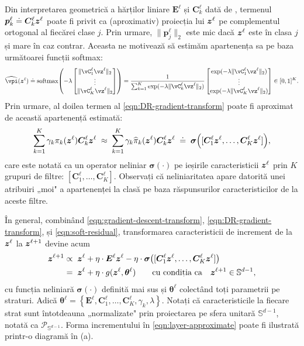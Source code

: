 \documentclass[../../book-main_ro.tex]{subfiles}
\begin{document}
Din interpretarea geometrică a hărților liniare $\bm E^\ell$ și $\bm C_k^\ell$ dată de , termenul $\bm p_{k}^{\ell} \doteq \bm C^{\ell}_k \bm{z}^{\ell}$ poate fi privit ca (aproximativ) proiecția lui $\bm{z}^{\ell}$ pe complementul ortogonal al fiecărei clase $j$. Prin urmare, $\|\bm p_{j}^{\ell}\|_2$ este mic dacă $\bm{z}^\ell$ este în clasa $j$ și mare în caz contrar. Aceasta ne motivează să estimăm apartenența sa pe baza următoarei funcții softmax:
\begin{equation}
    \widehat{\vpi}(\z^\ell) \doteq \softmax\rp{-\lambda\mat{\norm{\vC^{\ell}_{1}\vz^{\ell}}_{2} \\ \vdots \\ \norm{\vC^{\ell}_{K}\vz^{\ell}}_{2}}} = \frac{1}{\sum_{k = 1}^{K}\exp(-\lambda \norm{\vC^{\ell}_{k}\vz^{\ell}}_{2})}\mat{\exp(-\lambda\norm{\vC^{\ell}_{1}\vz^{\ell}}_{2}) \\ \vdots \\ \exp(-\lambda\norm{\vC^{\ell}_{K}\vz^{\ell}}_{2})} \in [0,1]^{K}.
\end{equation}
Prin urmare, al doilea termen al \eqref{eqn:DR-gradient-transform} poate fi aproximat de această apartenență estimată:
\begin{align}
\sum_{k=1}^K \gamma_{k} \pi_k(\bm{z}^\ell)\bm C_{k}^{\ell}  \bm{z}^{\ell} 
\; \approx \;  \sum_{k=1}^K \gamma_{k} \widehat{\pi}_k(\bm{z}^\ell)  \bm{C}^{\ell}_k  \bm{z}^{\ell} 
\; \doteq \; \bm \sigma\Big([\bm{C}^{\ell}_{1} \bm{z}^{\ell}, \dots, \bm{C}^{\ell}_{K} \bm{z}^{\ell}]\Big),
\label{eqn:soft-residual}
\end{align}
care este notată ca un operator neliniar $\bm \sigma(\cdot)$ pe ieșirile caracteristicii $\bm{z}^\ell$ prin $K$ grupuri de filtre: $[\bm{C}^{\ell}_{1}, \dots, \bm{C}^{\ell}_{K}]$. Observați că neliniaritatea apare datorită unei atribuiri „moi" a apartenenței la clasă pe baza răspunsurilor caracteristicilor de la aceste filtre.  

În general, combinând \eqref{eqn:gradient-descent-transform}, \eqref{eqn:DR-gradient-transform}, și \eqref{eqn:soft-residual}, 
transformarea caracteristicii de increment de la $\bm{z}^{\ell}$ la $\bm{z}^{\ell+1}$ devine acum
\begin{equation}\label{eqn:layer-approximate}
\begin{aligned}
\bm{z}^{\ell+1}  &\propto \; \bm{z}^\ell +  \eta \cdot  \bm E^{\ell} \bm{z}^{\ell} - \eta\cdot  \bm \sigma\big([\bm{C}^{\ell}_{1} \bm{z}^{\ell}, \dots, \bm{C}^{\ell}_{K} \bm{z}^{\ell}]\big)  \\
&= \; \bm{z}^\ell +  \eta \cdot g(\bm{z}^\ell, \bm \theta^\ell) \qquad \mbox{cu condiția ca} \quad \bm{z}^{\ell +1} \in \mathbb{S}^{d-1},
\end{aligned}
\end{equation}
cu funcția neliniară $\bm \sigma(\cdot)$ definită mai sus și $\bm \theta^\ell$ colectând toți parametrii pe straturi. Adică $\bm \theta^\ell =\left\{\bm E^\ell, \bm{C}^{\ell}_{1}, \dots, \bm{C}^{\ell}_{K}, \gamma_{k}, \lambda\right\}$. Notați că caracteristicile la fiecare strat sunt întotdeauna „normalizate" prin proiectarea pe sfera unitară $\mathbb S^{d-1}$, notată ca $\mathcal P_{\mathbb S^{d-1}}$. Forma incrementului în \eqref{eqn:layer-approximate} poate fi ilustrată printr-o diagramă în (a).
\end{document}
